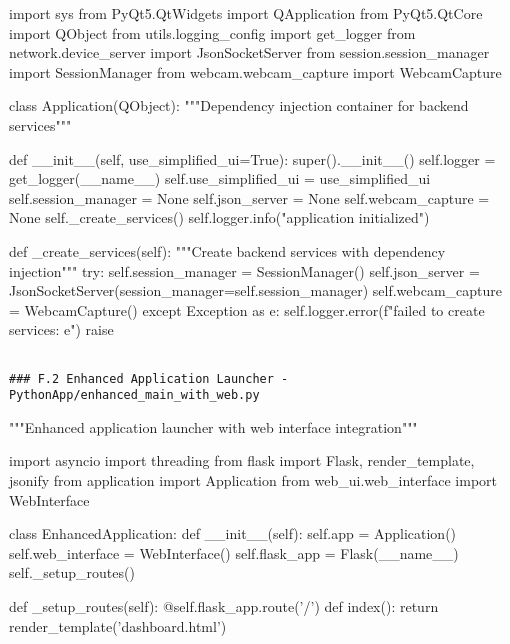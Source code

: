 \documentclass[12pt,a4paper]{report}
\begin{document}
import sys
from PyQt5.QtWidgets import QApplication
from PyQt5.QtCore import QObject
from utils.logging\_config import get\_logger
from network.device\_server import JsonSocketServer
from session.session\_manager import SessionManager
from webcam.webcam\_capture import WebcamCapture


class Application(QObject):
    """Dependency injection container for backend services"""

    def \_\_init\_\_(self, use\_simplified\_ui=True):
        super().\_\_init\_\_()
        self.logger = get\_logger(\_\_name\_\_)
        self.use\_simplified\_ui = use\_simplified\_ui
        self.session\_manager = None
        self.json\_server = None
        self.webcam\_capture = None
        self.\_create\_services()
        self.logger.info("application initialized")

    def \_create\_services(self):
        """Create backend services with dependency injection"""
        try:
            self.session\_manager = SessionManager()
            self.json\_server = JsonSocketServer(session\_manager=self.session\_manager)
            self.webcam\_capture = WebcamCapture()
        except Exception as e:
            self.logger.error(f"failed to create services: {e}")
            raise
\begin{verbatim}

### F.2 Enhanced Application Launcher - PythonApp/enhanced_main_with_web.py

\end{verbatim}
"""Enhanced application launcher with web interface integration"""

import asyncio
import threading
from flask import Flask, render\_template, jsonify
from application import Application
from web\_ui.web\_interface import WebInterface


class EnhancedApplication:
    def \_\_init\_\_(self):
        self.app = Application()
        self.web\_interface = WebInterface()
        self.flask\_app = Flask(\_\_name\_\_)
        self.\_setup\_routes()

    def \_setup\_routes(self):
        @self.flask\_app.route('/')
        def index():
            return render\_template('dashboard.html')
\end{document}
